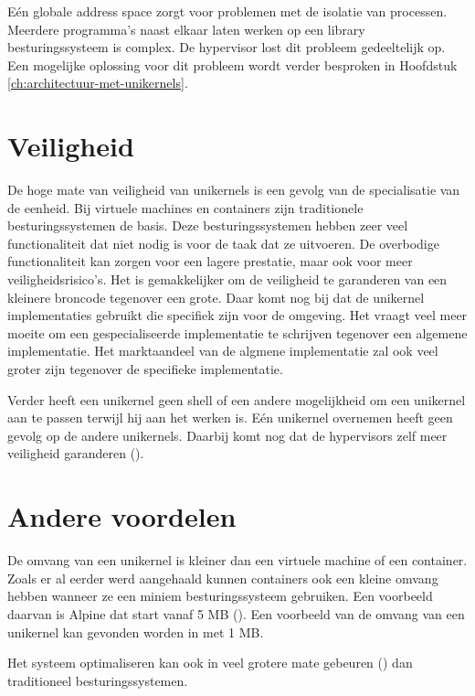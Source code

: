 \documentclass[pdftex,a4paper,12pt,twoside]{report}
\begin{document}
Eén globale address space zorgt voor problemen met de isolatie van processen. Meerdere programma's naast elkaar laten werken op een library besturingssysteem is complex. De hypervisor lost dit probleem gedeeltelijk op. Een mogelijke oplossing voor dit probleem wordt verder besproken in Hoofdstuk \ref{ch:architectuur-met-unikernels}.

\section{Veiligheid}

De hoge mate van veiligheid van unikernels is een gevolg van de specialisatie van de eenheid. Bij virtuele machines en containers zijn traditionele besturingssystemen de basis. Deze besturingssystemen hebben zeer veel functionaliteit dat niet nodig is voor de taak dat ze uitvoeren. De overbodige functionaliteit kan zorgen voor een lagere prestatie, maar ook voor meer veiligheidsrisico's. Het is gemakkelijker om de veiligheid te garanderen van een kleinere broncode tegenover een grote. Daar komt nog bij dat de unikernel implementaties gebruikt die specifiek zijn voor de omgeving. Het vraagt veel meer moeite om een gespecialiseerde implementatie te schrijven tegenover een algemene implementatie. Het marktaandeel van de algmene implementatie zal ook veel groter zijn tegenover de specifieke implementatie.

Verder heeft een unikernel geen shell of een andere mogelijkheid om een unikernel aan te passen terwijl hij aan het werken is. Eén unikernel overnemen heeft geen gevolg op de andere unikernels. Daarbij komt nog dat de hypervisors zelf meer veiligheid garanderen (\cite{colp_breaking_2011}).

\section{Andere voordelen}
\label{sec:bene_unikernels}

De omvang van een unikernel is kleiner dan een virtuele machine of een container. Zoals er al eerder werd aangehaald kunnen containers ook een kleine omvang hebben wanneer ze een miniem besturingssysteem gebruiken. Een voorbeeld daarvan is Alpine dat start vanaf 5 MB (\cite{_gliderlabs/docker-alpine_????}).
Een voorbeeld van de omvang van een unikernel kan gevonden worden in \cite[hoofdstuk 4, p.~10]{madhavapeddy_jitsu:_2015} met 1 MB.

Het systeem optimaliseren kan ook in veel grotere mate gebeuren (\cite{madhavapeddy_turning_2010}) dan traditioneel besturingssystemen.
\end{document}
